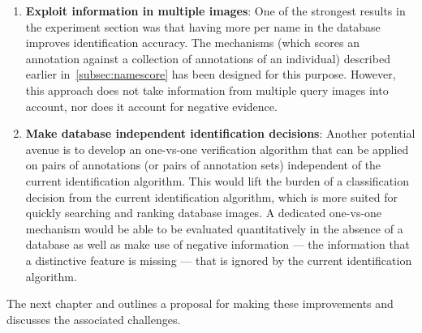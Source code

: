 \begin{enumerate}

        \item \textbf{Exploit information in multiple images}:
            One of the strongest results in the experiment section was
              that having more \exemplars{} per name in the database
              improves identification accuracy.
            The \namescoring{} mechanisms (which scores an annotation
              against a collection of annotations of an individual)
              described earlier in~\cref{subsec:namescore} has been
              designed for this purpose.
            However, this approach does not take information from
              multiple query images into account, nor does it account for
              negative evidence.

        \item \textbf{Make database independent identification decisions}:
            Another potential avenue is to develop an one-vs-one
              verification algorithm that can be applied on pairs of
              annotations (or pairs of annotation sets) independent of
              the current identification algorithm.
            This would lift the burden of a classification decision
              from the current identification algorithm, which is more
              suited for quickly searching and ranking database images.
            A dedicated one-vs-one mechanism would be able to be
              evaluated quantitatively in the absence of a database as
              well as make use of negative information --- the
              information that a distinctive feature is missing --- that
              is ignored by the current identification algorithm.
        \end{enumerate}
    The next chapter and outlines a proposal for making these
      improvements and discusses the associated challenges.



